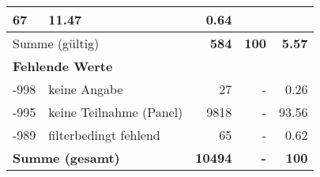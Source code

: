 \begin{longtable}{lXrrr}
       \num{67} &
       \num[round-mode=places,round-precision=2]{11.47} &
         \num[round-mode=places,round-precision=2]{0.64} \\
     \midrule
     \multicolumn{2}{l}{Summe (gültig)} &
       \textbf{\num{584}} &
     \textbf{\num{100}} &
       \textbf{\num[round-mode=places,round-precision=2]{5.57}} \\
     \multicolumn{5}{l}{\textbf{Fehlende Werte}}\\
       -998 &
       keine Angabe &
         \num{27} &
        - &
         \num[round-mode=places,round-precision=2]{0.26} \\
       -995 &
       keine Teilnahme (Panel) &
         \num{9818} &
        - &
         \num[round-mode=places,round-precision=2]{93.56} \\
       -989 &
       filterbedingt fehlend &
         \num{65} &
        - &
         \num[round-mode=places,round-precision=2]{0.62} \\
     \midrule
     \multicolumn{2}{l}{\textbf{Summe (gesamt)}} &
          \textbf{\num{10494}} &
        \textbf{-} &
        \textbf{\num{100}} \\
     \bottomrule
     \end{longtable}
     
